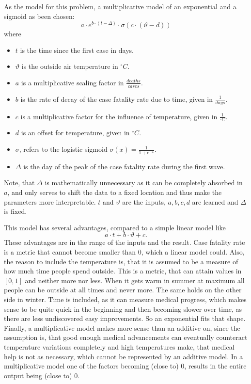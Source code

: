 \documentclass{article}
\begin{document}
As the model for this problem, a multiplicative model of an exponential and a sigmoid as been chosen: \begin{equation}
  a \cdot e^{b \cdot (t - \Delta)} \cdot \sigma \left( c \cdot (\vartheta - d) \right) 
\end{equation} where \begin{itemize}
  \item $t$ is the time since the first case in days.
  \item $\vartheta$ is the outside air temperature in $^\circ C$.
  \item $a$ is a multiplicative scaling factor in $\frac{deaths}{cases}$.
  \item $b$ is the rate of decay of the case fatality rate due to time, given in $\frac{1}{days}$.
  \item $c$ is a multiplicative factor for the influence of temperature, given in $\frac{1}{^\circ C}$.
  \item $d$ is an offset for temperature, given in $^\circ C$.
  \item $\sigma$, refers to the logistic sigmoid $\sigma(x) = \frac{1}{1 + e^{-x}}$.
  \item $\Delta$ is the day of the peak of the case fatality rate during the first wave.
\end{itemize}

Note, that $\Delta$ is mathematically unnecessary as it can be completely absorbed in $a$, and only serves to shift the data to a fixed location and thus make the parameters more interpretable. $t$ and $\vartheta$ are the inputs, $a, b, c, d$ are learned and $\Delta$ is fixed.

This model has several advantages, compared to a simple linear model like \begin{equation}
  a \cdot t + b \cdot \vartheta + c.
\end{equation}
These advantages are in the range of the inputs and the result. Case fatality rate is a metric that cannot become smaller than 0, which a linear model could. 
Also, the reason to include the temperature is, that it is assumed to be a measure of how much time people spend outside. This is a metric, that can attain values in $[0, 1]$ and neither more nor less. When it gets warm in summer at maximum all people can be outside at all times and never more. The same holds on the other side in winter. 
Time is included, as it can measure medical progress, which makes sense to be quite quick in the beginning and then becoming slower over time, as there are less undiscovered easy improvements. So an exponential fits that shape.
Finally, a multiplicative model makes more sense than an additive on, since the assumption is, that good enough medical advancements can eventually counteract temperature variations completely and high temperatures make, that medical help is not as necessary, which cannot be represented by an additive model. In a multiplicative model one of the factors becoming (close to) 0, results in the entire output being (close to) 0.
\end{document}
